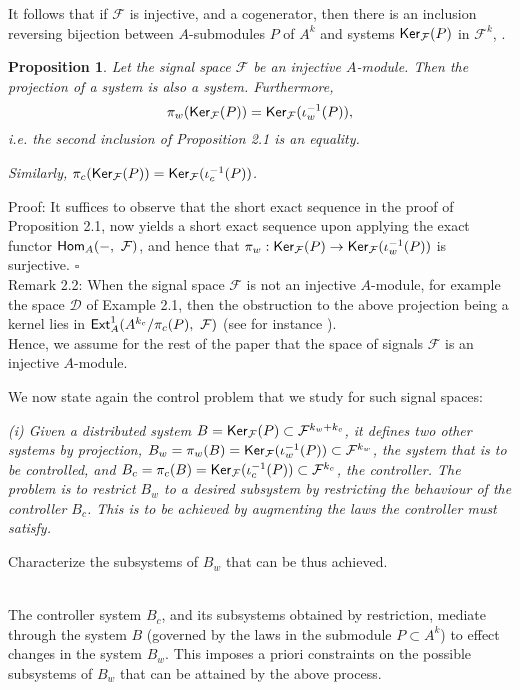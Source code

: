 \documentclass[11pt]{amsart}
\newtheorem{proposition}{Proposition}[section]
\def\homo{\mathop{\sf Hom}}
\def\ker{\mathop{\sf Ker}}
\def\ext{\sf Ext}
\def\D{\mathcal{D}}
\newcommand{\F}{\mathcal{F}}
\begin{document}
{It follows that if $\F$ is injective, and a cogenerator, then there is an inclusion reversing bijection between $A$-submodules $P$ of $A^k$ and systems $\ker_\F(P)$ in $\F^k$, \cite{sst}. 

\begin{proposition} Let the signal space $\F$ be an injective $A$-module. Then the projection of a system is also a system. Furthermore, 
\[\pi_w({\ker}_\F(P)) = {\ker}_\F(\iota_w^{-1}(P)) ,\]
i.e. the second inclusion of Proposition 2.1 is an equality. 

Similarly, $\pi_c({\ker}_\F(P)) = {\ker}_\F(\iota_c^{-1}(P))$.
\end{proposition} 
\noindent Proof: It suffices to observe that the short exact sequence in the proof of Proposition 2.1, now yields a short exact sequence upon applying the exact functor $\homo_A( - ,~\F)$, and hence that $\pi_w: \ker_\F(P) \rightarrow \ker_\F(\iota_w^{-1}(P))$ is surjective. \hspace*{\fill}$\square$\\
 
\noindent Remark 2.2: When the signal space $\F$ is not an injective $A$-module, for example the space $\D$ of Example 2.1, then the obstruction to the above projection being a kernel lies in ${\ext}_A^1(A^{k_c}/\pi_c(P), ~\F)$ (see for instance \cite{sg}).\\

Hence, we assume for the rest of the paper that the space of signals $\F$ is an injective $A$-module.

We now state again the control problem that we study for such signal spaces: \\

{\em (i) Given a distributed system $B = \ker_\F(P) \subset \F^{k_w+k_c}$, it defines two other systems by projection, $B_w = \pi_w(B) = \ker_\F(\iota_w^{-1}(P)) \subset \F^{k_w}$, the system that is to be controlled, and $B_c = \pi_c(B) = \ker_\F(\iota_c^{-1}(P)) \subset \F^{k_c}$, the controller. The problem is to restrict $B_w$ to a desired subsystem by restricting the behaviour of the controller $B_c$. This is to be achieved by augmenting the laws the controller must satisfy.

Characterize the subsystems of $B_w$ that can be thus achieved.}\\

The controller system $B_c$, and its subsystems obtained by restriction, mediate through the system $B$ (governed by the laws in the submodule $P \subset A^k$) to effect changes in the system $B_w$. This imposes a priori constraints on the possible subsystems of $B_w$ that can be attained by the above process. 

}
\end{document}
